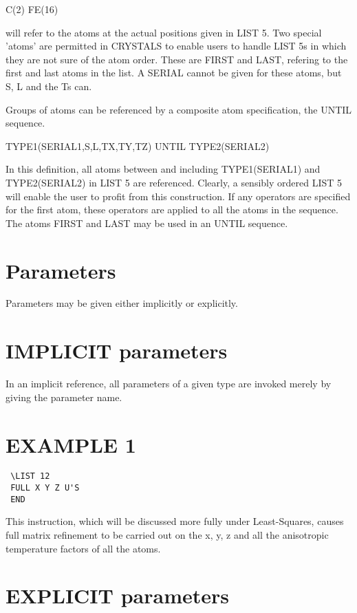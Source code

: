 \documentclass[10pt,a4paper]{report}
\begin{document}
C(2) FE(16)


will refer to the atoms at the actual positions given in LIST 5. Two special
 'atoms' are permitted in CRYSTALS to enable users to handle LIST 5s in which
 they are not sure of the atom order. These are FIRST and LAST, refering to
 the first and last atoms in the list. A  SERIAL cannot be given for these 
 atoms, but S, L and the Ts can.


Groups of atoms can be referenced by a composite atom specification, the
 UNTIL sequence.


TYPE1(SERIAL1,S,L,TX,TY,TZ) UNTIL TYPE2(SERIAL2)


In this definition, all atoms between and including TYPE1(SERIAL1) and
 TYPE2(SERIAL2) in LIST 5 are referenced. Clearly, a sensibly ordered 
 LIST 5 will enable the user to profit from this construction.
 If any operators 
 are specified for the first atom, these operators are applied to all the atoms
 in the sequence. The atoms FIRST and LAST may be used in an UNTIL sequence.



\section{Parameters}


Parameters may be given either implicitly or explicitly.
\section{IMPLICIT parameters}


In an implicit reference, all parameters 
 of a given type are invoked merely by giving the parameter name.

\section{EXAMPLE 1}
\small\begin{verbatim}
 \LIST 12
 FULL X Y Z U'S
 END
\end{verbatim}\normalsize




This instruction, which will be discussed more fully under Least-Squares,
 causes full matrix refinement to be carried out on the x, y, z and all the
 anisotropic temperature factors of all the atoms.



\section{EXPLICIT parameters}
\end{document}
